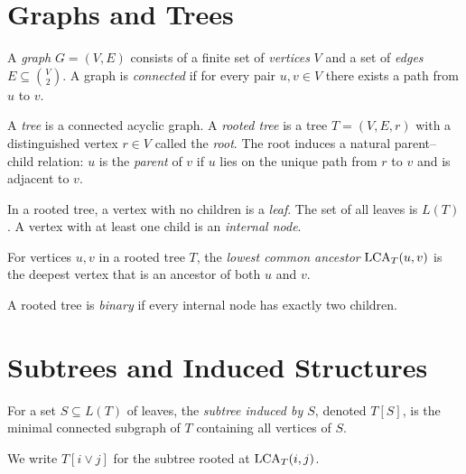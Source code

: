 \section{Graphs and Trees}

\begin{definition}[Graph]
A \emph{graph} $G = (V, E)$ consists of a finite set of \emph{vertices} $V$ and a set of \emph{edges} $E \subseteq \binom{V}{2}$. A graph is \emph{connected} if for every pair $u, v \in V$ there exists a path from $u$ to $v$.
\end{definition}

\begin{definition}[Tree]
A \emph{tree} is a connected acyclic graph. A \emph{rooted tree} is a tree $T = (V, E, r)$ with a distinguished vertex $r \in V$ called the \emph{root}. The root induces a natural parent--child relation: $u$ is the \emph{parent} of $v$ if $u$ lies on the unique path from $r$ to $v$ and is adjacent to $v$.
\end{definition}

\begin{definition}
In a rooted tree, a vertex with no children is a \emph{leaf}. The set of all leaves is $L(T)$. A vertex with at least one child is an \emph{internal node}.
\end{definition}

\begin{definition}
For vertices $u, v$ in a rooted tree $T$, the \emph{lowest common ancestor} $\operatorname{LCA}_T(u,v)$ is the deepest vertex that is an ancestor of both $u$ and $v$.
\end{definition}

\begin{definition}
A rooted tree is \emph{binary} if every internal node has exactly two children.
\end{definition}

\section{Subtrees and Induced Structures}

\begin{definition}[Subtree]
For a set $S \subseteq L(T)$ of leaves, the \emph{subtree induced by $S$}, denoted $T[S]$, is the minimal connected subgraph of $T$ containing all vertices of $S$.
\end{definition}

\begin{notation}
We write $T[i \vee j]$ for the subtree rooted at $\operatorname{LCA}_T(i,j)$.
\end{notation}

